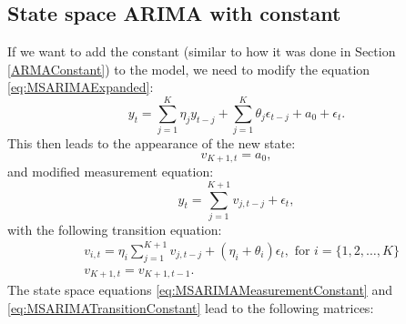 \documentclass[]{book}
\theoremstyle{definition}
\theoremstyle{definition}
\theoremstyle{definition}
\theoremstyle{definition}
\theoremstyle{remark}
\begin{document}
\hypertarget{state-space-arima-with-constant}{%
\subsection{State space ARIMA with constant}\label{state-space-arima-with-constant}}

If we want to add the constant (similar to how it was done in Section \ref{ARMAConstant}) to the model, we need to modify the equation \eqref{eq:MSARIMAExpanded}:
\begin{equation}
  y_t = \sum_{j=1}^K \eta_j y_{t-j} + \sum_{j=1}^K \theta_j \epsilon_{t-j} + a_0 + \epsilon_t .
  \label{eq:MSARIMAExpandedConstant}
\end{equation}
This then leads to the appearance of the new state:
\begin{equation}
  v_{K+1,t} = a_0 ,
  \label{eq:MSARIMAStateConstant}
\end{equation}
and modified measurement equation:
\begin{equation}
  y_t = \sum_{j=1}^{K+1} v_{j,t-j} + \epsilon_t ,
  \label{eq:MSARIMAMeasurementConstant}
\end{equation}
with the following transition equation:
\begin{equation}
  \begin{aligned}
    & v_{i,t} = \eta_i \sum_{j=1}^{K+1} v_{j,t-j} + (\eta_i + \theta_i) \epsilon_{t} , \text{ for } i=\{1, 2, \dots, K\} \\
    & v_{K+1, t} = v_{K+1, t-1} .
  \end{aligned}
  \label{eq:MSARIMATransitionConstant}
\end{equation}
The state space equations \eqref{eq:MSARIMAMeasurementConstant} and \eqref{eq:MSARIMATransitionConstant} lead to the following matrices:
\end{document}
